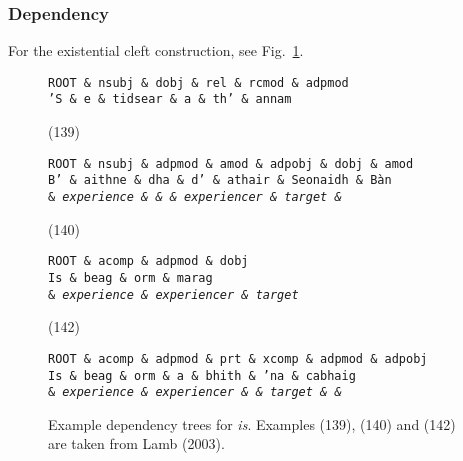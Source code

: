 \documentclass[a4paper]{article}
\begin{document}
\subsubsection*{Dependency}

 For the existential cleft construction, see Fig.~\ref{fig:teacher}.
\begin{figure}
\begin{center}
\begin{dependency}
\begin{deptext}
\tt ROOT \& \tt nsubj \& \tt dobj \& \tt rel \& \tt rcmod \& \tt adpmod \\
'S \& e \& tidsear \& a \& th' \& annam \\
\end{deptext}
\end{dependency}
(139)\begin{dependency}
\begin{deptext}
\tt ROOT \& nsubj \& adpmod \& \tt amod \& \tt adpobj \& \tt dobj \& \tt amod \\
B' \& aithne \& dha \& d' \& athair \& Seonaidh \& B\`an\\
 \& \it experience \& \& \& \it experiencer \& \it target \& \\
\end{deptext}
\end{dependency}
(140)\begin{dependency}
\begin{deptext}
\tt ROOT \& \tt acomp \& \tt adpmod \& \tt dobj\\
Is \& beag \& orm \& marag\\
 \& \it experience \& \it experiencer \& \it target \\
\end{deptext}
\end{dependency}
(142)\begin{dependency}
\begin{deptext}
\tt ROOT \& \tt acomp \& \tt adpmod \& \tt prt \& \tt xcomp \& \tt adpmod \& \tt adpobj \\
Is \& beag \& orm \& a \& bhith \& 'na \& cabhaig \\
 \& \it experience \& \it experiencer \& \& \it target \& \& \\
\end{deptext}
\end{dependency}
\end{center}
\caption{Example dependency trees for \textit{is}. Examples (139), (140) and (142) are taken from Lamb (2003). \label{fig:teacher}}
\end{figure}
\end{document}
